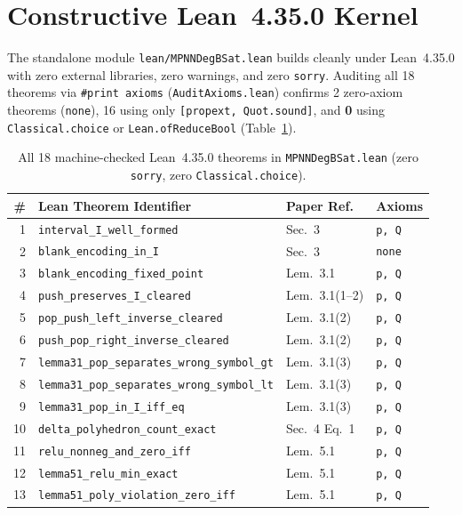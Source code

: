 \documentclass[10pt,twocolumn]{article}
\begin{document}
\section{Constructive Lean~4.35.0 Kernel}\label{sec:lean}
The standalone module \texttt{lean/MPNNDegBSat.lean} builds cleanly under Lean~4.35.0 with zero external libraries, zero warnings, and zero \texttt{sorry}. Auditing all 18 theorems via \texttt{\#print axioms} (\texttt{AuditAxioms.lean}) confirms 2 zero-axiom theorems (\texttt{none}), 16 using only \texttt{[propext, Quot.sound]}, and \textbf{0} using \texttt{Classical.choice} or \texttt{Lean.ofReduceBool} (Table~\ref{tab:lean}).

\begin{table}[t]
\centering
\caption{All 18 machine-checked Lean~4.35.0 theorems in \texttt{MPNNDegBSat.lean} (zero \texttt{sorry}, zero \texttt{Classical.choice}).}
\label{tab:lean}
\scriptsize
\setlength{\tabcolsep}{3.0pt}
\begin{tabular}{@{}rlll@{}}
\toprule
\# & Lean Theorem Identifier & Paper Ref. & Axioms \\
\midrule
1 & \texttt{interval\_I\_well\_formed} & Sec.~3 & \texttt{p, Q} \\
2 & \texttt{blank\_encoding\_in\_I} & Sec.~3 & \texttt{none} \\
3 & \texttt{blank\_encoding\_fixed\_point} & Lem.~3.1 & \texttt{p, Q} \\
4 & \texttt{push\_preserves\_I\_cleared} & Lem.~3.1(1--2) & \texttt{p, Q} \\
5 & \texttt{pop\_push\_left\_inverse\_cleared} & Lem.~3.1(2) & \texttt{p, Q} \\
6 & \texttt{push\_pop\_right\_inverse\_cleared} & Lem.~3.1(2) & \texttt{p, Q} \\
7 & \texttt{lemma31\_pop\_separates\_wrong\_symbol\_gt} & Lem.~3.1(3) & \texttt{p, Q} \\
8 & \texttt{lemma31\_pop\_separates\_wrong\_symbol\_lt} & Lem.~3.1(3) & \texttt{p, Q} \\
9 & \texttt{lemma31\_pop\_in\_I\_iff\_eq} & Lem.~3.1(3) & \texttt{p, Q} \\
10 & \texttt{delta\_polyhedron\_count\_exact} & Sec.~4 Eq.~1 & \texttt{p, Q} \\
11 & \texttt{relu\_nonneg\_and\_zero\_iff} & Lem.~5.1 & \texttt{p, Q} \\
12 & \texttt{lemma51\_relu\_min\_exact} & Lem.~5.1 & \texttt{p, Q} \\
13 & \texttt{lemma51\_poly\_violation\_zero\_iff} & Lem.~5.1 & \texttt{p, Q} \\

\end{tabular}
\end{table}
\end{document}
